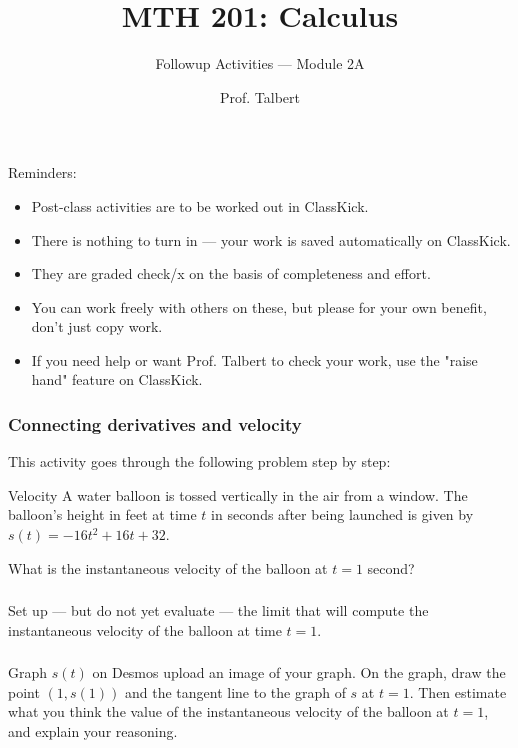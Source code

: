 \documentclass{beamer}
\title{MTH 201: Calculus}
\subtitle{Followup Activities --- Module 2A}
\author{Prof. Talbert}
\institute{GVSU}
\begin{document}

\begin{frame}{Reminders:}

    \begin{itemize}
        \item Post-class activities are to be worked out in ClassKick.
        \item There is nothing to turn in --- your work is saved automatically on ClassKick. 
        \item They are graded check/x on the basis of completeness and effort. 
        \item You can work freely with others on these, but please for your own benefit, don't just copy work. 
        \item If you need help or want Prof. Talbert to check your work, use the "raise hand" feature on ClassKick. 
    \end{itemize}
    
    \end{frame}

    \begin{frame}
        \frametitle{Connecting derivatives and velocity}
    
        This activity goes through the following problem step by step: 
    
        \begin{block}{Velocity}
            A water balloon is tossed vertically in the air from a window. The balloon's height in feet at time $t$ in seconds after being launched is given by $s(t) = -16t^2 + 16t + 32$. 
    
           What is the instantaneous velocity of the balloon at $t=1$ second? 

        \end{block}
    
    \end{frame}

    \begin{frame}[t]
        \frametitle{}
    
        Set up --- but do not yet evaluate --- the limit that will compute the instantaneous velocity of the balloon at time $t=1$. 
    
    \end{frame}

    \begin{frame}[t]
        \frametitle{}
    
        Graph $s(t)$ on Desmos upload an image of your graph. On the graph, draw the point $(1, s(1))$ and the tangent line to the graph of $s$ at $t=1$. Then estimate what you think the value of the instantaneous velocity of the balloon at $t=1$, and explain your reasoning. 
    
    \end{frame}
\end{document}
